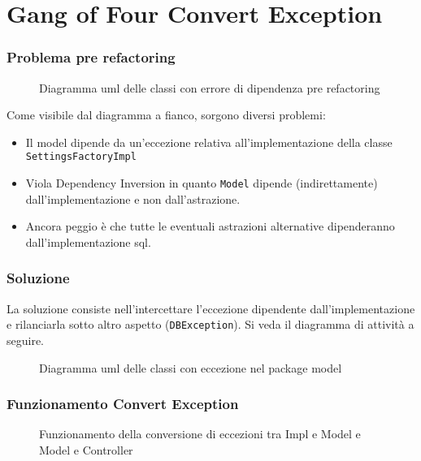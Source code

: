 \section{Gang of Four Convert Exception}
\begin{frame}
    \frametitle{Problema pre refactoring}

    \begin{minipage}{.40\textwidth}
        \begin{figure}
            \centering
            \caption{Diagramma uml delle classi con errore di dipendenza pre refactoring}
        \end{figure}
    \end{minipage}\hfill
    \begin{minipage}{.58\textwidth}
        Come visibile dal diagramma a fianco, sorgono diversi problemi:
        \begin{itemize}
            \item Il model dipende da un'eccezione relativa all'implementazione della classe \texttt{SettingsFactoryImpl}
            \item Viola Dependency Inversion in quanto \texttt{Model} dipende (indirettamente) dall'implementazione e non dall'astrazione.
            \item Ancora peggio è che tutte le eventuali astrazioni alternative dipenderanno dall'implementazione sql.
        \end{itemize}
    \end{minipage}
\end{frame}

\begin{frame}
    \frametitle{Soluzione}

    \begin{minipage}{.40\textwidth}
        La soluzione consiste nell'intercettare l'eccezione dipendente dall'implementazione e rilanciarla sotto altro aspetto (\texttt{DBException}). Si veda il diagramma di attività a seguire.
    \end{minipage}\hfill
    \begin{minipage}{.58\textwidth}
        \begin{figure}
            \centering
            \caption{Diagramma uml delle classi con eccezione nel package model}
        \end{figure}
    \end{minipage}
\end{frame}

\begin{frame}
    \frametitle{Funzionamento Convert Exception}
    \begin{figure}
        \centering
        \label{uml:act:convex}\caption{Funzionamento della conversione di eccezioni tra Impl e Model e Model e Controller}
    \end{figure}
\end{frame}
